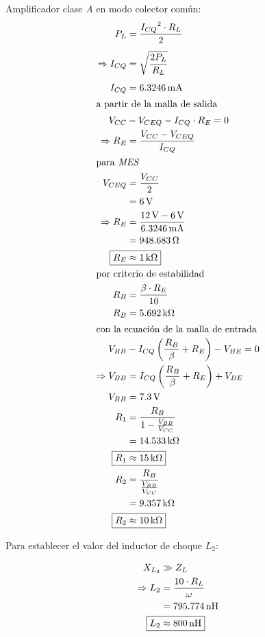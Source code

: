 \documentclass[journal]{IEEEtran}
\begin{document}
Amplificador clase \emph{A} en modo colector común:
\begin{align*}
    P_L &= \frac{{I_{CQ}}^2 \cdot R_L}{2}\\[1ex]
    \Rightarrow I_{CQ} &= \sqrt{\frac{2 P_L}{R_L}}\\[1ex]
    I_{CQ} &= \SI{6.3246}{\milli\ampere}\\
    \intertext{a partir de la malla de salida}
    V_{CC} &- V_{CEQ}-I_{CQ}\cdot R_E = 0\\
    \Rightarrow R_E &= \frac{V_{CC}-V_{CEQ}}{I_{CQ}}\\
    \intertext{para \emph{MES}}
    V_{CEQ} &= \frac{V_{CC}}{2}\\
    &= \SI{6}{\volt}\\
    \Rightarrow R_E &= \frac{\SI{12}{\volt} -\SI{6}{\volt}}{\SI{6.3246}{\milli\ampere}}\\
    &= \SI{948.683}{\ohm}\\
    \Aboxed{R_E &\approx \SI{1}{\kilo\ohm}}\\
    \intertext{por criterio de estabilidad}
    R_B &= \frac{\beta \cdot R_E}{10}\\
    R_B &= \SI{5.692}{\kilo\ohm}\\
    \intertext{con la ecuación de la malla de entrada}
    V_{BB} &- I_{CQ}\left( \frac{R_B}{\beta}+R_E \right) - V_{BE} = 0\\
    \Rightarrow V_{BB} &= I_{CQ}\left( \frac{R_B}{\beta}+R_E \right) + V_{BE}\\
    V_{BB} &= \SI{7.3}{\volt}\\
    R_1 &= \frac{R_B}{1-\frac{V_{BB}}{V_{CC}}}\\
    &= \SI{14.533}{\kilo\ohm}\\
    \Aboxed{R_1 &\approx \SI{15}{\kilo\ohm}}\\
    R_2 &= \frac{R_B}{\frac{V_{BB}}{V_{CC}}}\\
    &= \SI{9.357}{\kilo\ohm}\\
    \Aboxed{R_2 &\approx \SI{10}{\kilo\ohm}}
\end{align*}

Para establecer el valor del inductor de choque $L_2$:

\begin{align*}
    X_{L_2} &\gg Z_L\\
    \Rightarrow L_2 &= \frac{10\cdot R_L}{\omega}\\
    &= \SI{795.774}{\nano\henry}\\
    \Aboxed{L_2 &\approx \SI{800}{\nano\henry}}
\end{align*}
\end{document}
